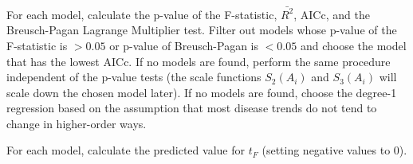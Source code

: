 \documentclass[12pt, a4paper, twocolumn]{article}
\begin{document}
For each model, calculate the p-value of the F-statistic, $\bar{R^2}$, AICc, and the Breusch-Pagan Lagrange Multiplier test. Filter out models whose p-value of the F-statistic is $> 0.05$ or p-value of Breusch-Pagan is $< 0.05$ and choose the model that has the lowest AICc. If no models are found, perform the same procedure independent of the p-value tests (the scale functions $S_2(A_i)$ and $S_3(A_i)$ will scale down the chosen model later). If no models are found, choose the degree-1 regression based on the assumption that most disease trends do not tend to change in higher-order ways.

For each model, calculate the predicted value for $t_F$ (setting negative values to 0).


\nocite{*}

\end{document}
